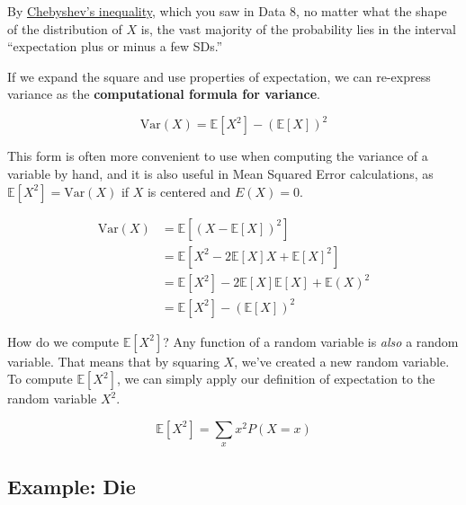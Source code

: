 \documentclass[
  letterpaper,
  DIV=11,
  numbers=noendperiod]{scrreprt}
\begin{document}
By
\href{https://www.inferentialthinking.com/chapters/14/2/Variability.html\#Chebychev's-Bounds}{Chebyshev's
inequality}, which you saw in Data 8, no matter what the shape of the
distribution of \(X\) is, the vast majority of the probability lies in
the interval ``expectation plus or minus a few SDs.''

If we expand the square and use properties of expectation, we can
re-express variance as the \textbf{computational formula for variance}.

\[\text{Var}(X) = \mathbb{E}[X^2] - (\mathbb{E}[X])^2\]

This form is often more convenient to use when computing the variance of
a variable by hand, and it is also useful in Mean Squared Error
calculations, as \(\mathbb{E}[X^2] = \text{Var}(X)\) if \(X\) is
centered and \(E(X)=0\).

\begin{tcolorbox}[enhanced jigsaw, titlerule=0mm, bottomtitle=1mm, arc=.35mm, colframe=quarto-callout-tip-color-frame, rightrule=.15mm, opacityback=0, opacitybacktitle=0.6, leftrule=.75mm, breakable, toprule=.15mm, colback=white, left=2mm, colbacktitle=quarto-callout-tip-color!10!white, toptitle=1mm, bottomrule=.15mm, title=\textcolor{quarto-callout-tip-color}{\faLightbulb}\hspace{0.5em}{Proof}, coltitle=black]

\[\begin{align}
   \text{Var}(X) &= \mathbb{E}[(X-\mathbb{E}[X])^2] \\
   &= \mathbb{E}[X^2 - 2\mathbb{E}[X]X + \mathbb{E}[X]^2] \\
   &= \mathbb{E}[X^2] - 2 \mathbb{E}[X]\mathbb{E}[X] + \mathbb{E}(X)^2\\
   &= \mathbb{E}[X^2] - (\mathbb{E}[X])^2
\end{align}\]

\end{tcolorbox}

How do we compute \(\mathbb{E}[X^2]\)? Any function of a random variable
is \emph{also} a random variable. That means that by squaring \(X\),
we've created a new random variable. To compute \(\mathbb{E}[X^2]\), we
can simply apply our definition of expectation to the random variable
\(X^2\).

\[\mathbb{E}[X^2] = \sum_{x} x^2 P(X = x)\]

\subsection{Example: Die}\label{example-die}
\end{document}

